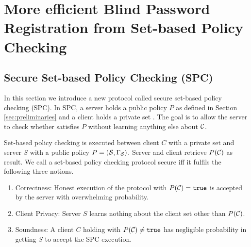 \section{More efficient Blind Password Registration from Set-based Policy Checking}\label{sec:spc-bpr}

\subsection{Secure Set-based Policy Checking (SPC)} \label{sec:spc}
In this section we introduce a new protocol called secure set-based policy checking (SPC). In SPC, a server holds a public policy $P$ as defined in Section \ref{sec:preliminaries} and a client holds a private set \cC. The goal is to allow the server to check whether \cC satisfies $P$ without learning anything else about $\mathcal{C}$. 

\begin{definition}\label{def:SPC}
Set-based policy checking is executed between client $C$ with a private set \cC and server $S$ with a public policy $P=(\mathcal{S},\Gamma_\mathcal{S})$.
Server and client retrieve $P(\mathcal{C})$ as result. 
We call a set-based policy checking protocol secure iff it fulfils the following three notions.
\begin{enumerate}
  \item Correctness: Honest execution of the protocol with $P(\mathcal{C})=\mathtt{true}$ is accepted by the server with overwhelming probability.
  \item Client Privacy: Server $S$ learns nothing about the client set \cC other than $P(\mathcal{C})$.
  \item Soundness: A client $C$ holding \cC with $P(\mathcal{C})\not=\mathtt{true}$ has negligible probability in getting $S$ to accept the SPC execution.
\end{enumerate}
\end{definition}

